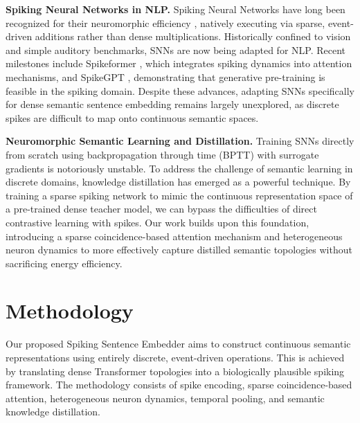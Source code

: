 \documentclass{article} %
\begin{document}
\textbf{Spiking Neural Networks in NLP.} Spiking Neural Networks have long been recognized for their neuromorphic efficiency \citep{roy2019towards}, natively executing via sparse, event-driven additions rather than dense multiplications. Historically confined to vision and simple auditory benchmarks, SNNs are now being adapted for NLP. Recent milestones include Spikeformer \citep{li2022spikeformer}, which integrates spiking dynamics into attention mechanisms, and SpikeGPT \citep{zhu2023spikegpt}, demonstrating that generative pre-training is feasible in the spiking domain. Despite these advances, adapting SNNs specifically for dense semantic sentence embedding remains largely unexplored, as discrete spikes are difficult to map onto continuous semantic spaces.

\textbf{Neuromorphic Semantic Learning and Distillation.} Training SNNs directly from scratch using backpropagation through time (BPTT) with surrogate gradients \citep{wu2018spatio, neftci2019surrogate} is notoriously unstable. To address the challenge of semantic learning in discrete domains, knowledge distillation \citep{hinton2015distilling} has emerged as a powerful technique. By training a sparse spiking network to mimic the continuous representation space of a pre-trained dense teacher model, we can bypass the difficulties of direct contrastive learning with spikes. Our work builds upon this foundation, introducing a sparse coincidence-based attention mechanism and heterogeneous neuron dynamics to more effectively capture distilled semantic topologies without sacrificing energy efficiency.

\section{Methodology}
\label{sec:methodology}

Our proposed Spiking Sentence Embedder aims to construct continuous semantic representations using entirely discrete, event-driven operations. This is achieved by translating dense Transformer topologies into a biologically plausible spiking framework. The methodology consists of spike encoding, sparse coincidence-based attention, heterogeneous neuron dynamics, temporal pooling, and semantic knowledge distillation.
\end{document}
